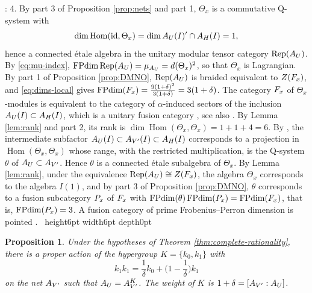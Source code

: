 \documentclass[leqno]{article}
\newcommand{\Q}{\mathrm{Q}}
\let\cal\relax
\newcommand{\cal}{\mathcal}
\newcommand{\qed}{\hfill \vrule height6pt  width6pt depth0pt}
\DeclareMathOperator{\Rep}{Rep} %
\newtheorem{prop}[thm]{Proposition}
\newenvironment{proof}[1][]{\noindent {\it Proof #1} : }{\hbox{~}\qed
\smallskip
}
\numberwithin{equation}{section}
\begin{document}
\begin{proof}
4. By part 3 of Proposition \ref{prop:nets} and part 1, $\Theta_x$ is a commutative $\Q$-system with
\[
\dim\operatorname{Hom}(\mathrm{id},\Theta_x) = \dim \cal A_U(I)' \cap \cal A_H(I) = 1,
\]
hence a connected \'etale algebra in the unitary modular tensor category $\Rep(\cal A_U)$. By \eqref{eq:mu-index}, $\operatorname{FPdim}\Rep(\cal A_U) = \mu_{\cal A_U} = d(\Theta_x)^2$, so that $\Theta_x$ is Lagrangian. By part 1 of Proposition \ref{prop:DMNO}, $\Rep(\cal A_U)$ is braided equivalent to $Z(\cal F_x)$, and \eqref{eq:dims-local} gives $\operatorname{FPdim}(\cal F_x) = \frac{9(1+\delta)^2}{3(1+\delta)} = 3(1+\delta)$. The category $\cal F_x$ of $\Theta_x$-modules is equivalent to the category of $\alpha$-induced sectors of the inclusion $\cal A_U(I) \subset \cal A_H(I)$, which is a unitary fusion category \cite[Section 4.6 p.~54]{BKLR15}, see also \cite[Proposition 4.5 p.~21]{Bis17a}. By Lemma \ref{lem:rank} and part 2, its rank is $\dim\operatorname{Hom}(\Theta_x,\Theta_x) = 1+1+4 = 6$. By \cite[Proposition 4.11 p.~49]{BKLR15}, the intermediate subfactor $\cal A_U(I) \subset \cal A_{V'}(I) \subset \cal A_H(I)$ corresponds to a projection in $\operatorname{Hom}(\Theta_x,\Theta_x)$ whose range, with the restricted multiplication, is the $\Q$-system $\theta$ of $\cal A_U \subset \cal A_{V'}$. Hence $\theta$ is a connected \'etale subalgebra of $\Theta_x$. By Lemma \ref{lem:rank}, under the equivalence $\Rep(\cal A_U) \cong Z(\cal F_x)$, the algebra $\Theta_x$ corresponds to the algebra $I(1)$, and by part 3 of Proposition \ref{prop:DMNO}, $\theta$ corresponds to a fusion subcategory $\cal P_x$ of $\cal F_x$ with $\operatorname{FPdim}(\theta)\operatorname{FPdim}(\cal P_x) = \operatorname{FPdim}(\cal F_x)$, that is, $\operatorname{FPdim}(\cal P_x) = 3$. A fusion category of prime Frobenius--Perron dimension is pointed \cite[Corollary 8.30 p.~37]{ENO05}.
\end{proof}

\begin{prop}
\label{prop:hypergroup-U}
Under the hypotheses of Theorem \ref{thm:complete-rationality}, there is a proper action of the hypergroup $K = \{k_0,k_1\}$ with
\[
k_1k_1 = \frac{1}{\delta}k_0+\Big(1-\frac{1}{\delta}\Big)k_1
\]
on the net $\cal A_{V'}$ such that $\cal A_U = \cal A_{V'}^K$. The weight of $K$ is $1+\delta = [\cal A_{V'} : \cal A_U]$.
\end{prop}
\end{document}
